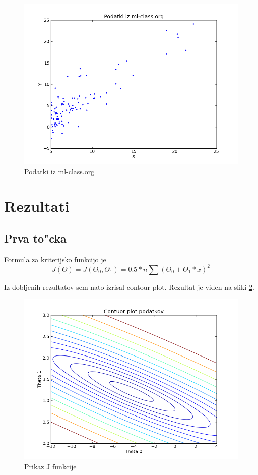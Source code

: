 \documentclass[a4paper,11pt]{article}
\begin{document}
\begin{figure}[H]
\begin{center}
\includegraphics[scale=0.3]{ml-data.png}
\caption{Podatki iz ml-class.org}
\end{center}
\label{mldata}
\end{figure}

\section{Rezultati}
\subsection{Prva to"cka}

Formula za kriterijsko funkcijo je 
\[
J(\Theta) = J(\Theta_0, \Theta_1) = 0.5 * n \sum (\Theta_0 + \Theta_1*x)^{2}
\]

Iz dobljenih rezultatov sem nato izrisal contour plot. Rezultat je viden na sliki \ref{contour}.

\begin{figure}[H]
\begin{center}
\includegraphics[scale=0.3]{contour.png}
\caption{Prikaz J funkcije}
\end{center}
\label{contour}
\end{figure}
\end{document}
